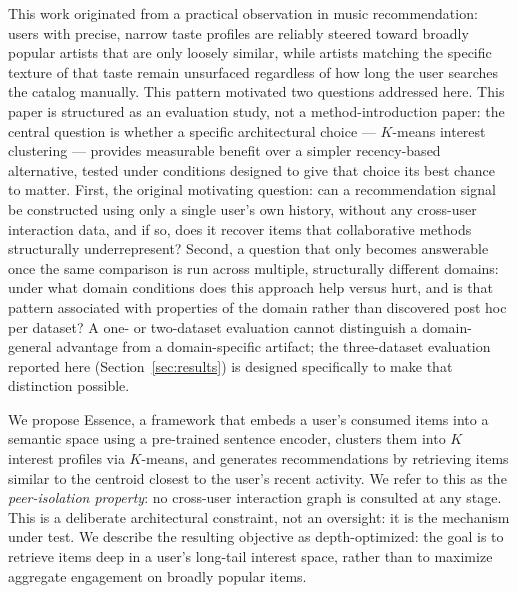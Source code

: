 \documentclass[11pt,a4paper]{article}
\begin{document}
This work originated from a practical observation in music recommendation:
users with precise, narrow taste profiles are reliably steered toward
broadly popular artists that are only loosely similar, while artists matching
the specific texture of that taste remain unsurfaced regardless of how long
the user searches the catalog manually. This pattern motivated two questions
addressed here. This paper is structured as an evaluation study, not a
method-introduction paper: the central question is whether a specific
architectural choice --- $K$-means interest clustering --- provides
measurable benefit over a simpler recency-based alternative, tested under
conditions designed to give that choice its best chance to matter. First, the original motivating question: can a recommendation
signal be constructed using only a single user's own history, without any
cross-user interaction data, and if so, does it recover items that collaborative methods
structurally underrepresent? Second, a question that only becomes answerable
once the same comparison is run across multiple, structurally different
domains: under what domain conditions does this approach help versus hurt,
and is that pattern associated with properties of the domain rather than
discovered post hoc per dataset? A one- or two-dataset evaluation cannot
distinguish a domain-general advantage from a domain-specific artifact; the
three-dataset evaluation reported here (Section~\ref{sec:results}) is
designed specifically to make that distinction possible.

We propose Essence, a framework that embeds a user's consumed items into a
semantic space using a pre-trained sentence encoder, clusters them into $K$
interest profiles via $K$-means, and generates recommendations by retrieving
items similar to the centroid closest to the user's recent activity. We refer
to this as the \emph{peer-isolation property}: no cross-user interaction graph
is consulted at any stage. This is a deliberate architectural constraint, not
an oversight: it is the mechanism under test. We describe the resulting objective as depth-optimized: the goal is to retrieve items deep in a user's long-tail interest space, rather than to maximize aggregate engagement on broadly popular items.
\end{document}
